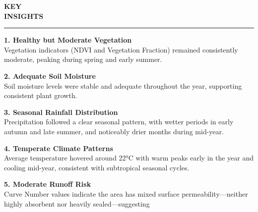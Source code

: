 \documentclass[12pt,a4paper]{article}
\newcommand{\HydroTitle}[1]{%
    {\titlefont\color{hydrosensblue}\bfseries\fontsize{60pt}{40pt}\selectfont #1}
}
\newcommand{\HydroContent}[1]{%
{\contentfont\color{black}\normalfont\fontsize{16pt}{20pt}\selectfont #1}
}
\begin{document}
\clearpage
\noindent
\begin{minipage}[t]{0.6\textwidth}

\HydroTitle{KEY\vspace{0.5cm}}\\ %
\HydroTitle{INSIGHTS}

  \vspace{0.5\baselineskip}
  \color{hydrosenscyan}\rule{0.25\textwidth}{3pt}
  \vspace{1\baselineskip}

  \HydroContent{\textbf{1. Healthy but Moderate Vegetation}\\
  Vegetation indicators (NDVI and Vegetation Fraction) remained consistently moderate, peaking during spring and early summer.}

  \vspace{0.6cm}

  \HydroContent{\textbf{2. Adequate Soil Moisture}\\
  Soil moisture levels were stable and adequate throughout the year, supporting consistent plant growth.}

  \vspace{0.6cm}

  \HydroContent{\textbf{3. Seasonal Rainfall Distribution}\\
  Precipitation followed a clear seasonal pattern, with wetter periods in early autumn and late summer, and noticeably drier months during mid-year.}

  \vspace{0.6cm}

  \HydroContent{\textbf{4. Temperate Climate Patterns}\\
  Average temperature hovered around 22°C with warm peaks early in the year and cooling mid-year, consistent with subtropical seasonal cycles.}

  \vspace{0.6cm}

  \HydroContent{\textbf{5. Moderate Runoff Risk}\\
  Curve Number values indicate the area has mixed surface permeability—neither highly absorbent nor heavily sealed—suggesting }
\end{minipage}%
\hfill
\begin{minipage}[t]{0.25\textwidth}

\end{minipage}
\end{document}

